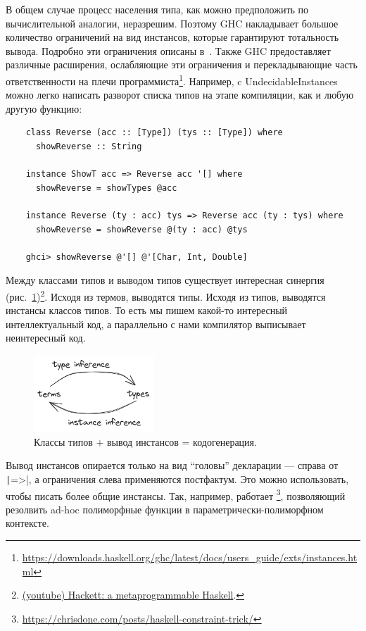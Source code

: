 В общем случае процесс населения типа, как можно предположить по вычислительной аналогии, неразрешим.
Поэтому GHC накладывает большое количество ограничений на вид инстансов, которые гарантируют тотальность вывода.
Подробно эти ограничения описаны в~\cite{sulzmann2007understanding}.
Также GHC предоставляет различные расширения, ослабляющие эти ограничения и перекладывающие часть ответственности на плечи программиста\footnote{\url{https://downloads.haskell.org/ghc/latest/docs/users_guide/exts/instances.html}}.
Например, c UndecidableInstances можно легко написать разворот списка типов на этапе компиляции, как и любую другую функцию:
\begin{verbatim}
    class Reverse (acc :: [Type]) (tys :: [Type]) where
      showReverse :: String

    instance ShowT acc => Reverse acc '[] where
      showReverse = showTypes @acc

    instance Reverse (ty : acc) tys => Reverse acc (ty : tys) where
      showReverse = showReverse @(ty : acc) @tys

    ghci> showReverse @'[] @'[Char, Int, Double]
\end{verbatim}

Между классами типов и выводом типов существует интересная синергия (рис.~\ref{fig:class-sinergy})\footnote{\href{https://youtu.be/5QQdI3P7MdY?si=VAgqyD7iycALTrz_}{(youtube) Hackett: a metaprogrammable Haskell}.}.
Исходя из термов, выводятся типы.
Исходя из типов, выводятся инстансы классов типов.
То есть мы пишем какой-то интересный интеллектуальный код, а параллельно с нами компилятор выписывает неинтересный код.

\begin{figure}[h]
    \centering
    \includegraphics[width=0.4\textwidth]{figs/class-sinergy}
    \caption{Классы типов + вывод инстансов = кодогенерация.}
    \label{fig:class-sinergy}
\end{figure}

Вывод инстансов опирается только на вид ``головы'' декларации --- справа от \texttt|=>|, а ограничения слева применяются постфактум.
Это можно использовать, чтобы писать более общие инстансы.
Так, например, работает \footnote{\url{https://chrisdone.com/posts/haskell-constraint-trick/}}, позволяющий резолвить ad-hoc полиморфные функции в параметрически-полиморфном контексте.

